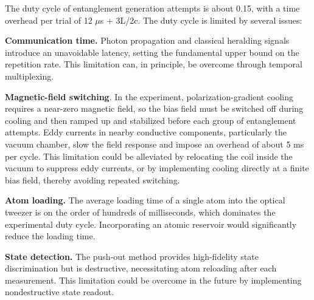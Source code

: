 \documentclass[aps,reprint,showpacs,superscriptaddress]{revtex4-2}
\begin{document}
The duty cycle of entanglement generation attempts is about 0.15, with a time overhead per trial of 12 $\mu$s + 3L/2c. The duty cycle is limited by several issues:

\textbf{Communication time.} Photon propagation and classical heralding signals introduce an unavoidable latency, setting the fundamental upper bound on the repetition rate. This limitation can, in principle, be overcome through temporal multiplexing.

\textbf{Magnetic-field switching}. In the experiment, polarization-gradient cooling requires a near-zero magnetic field, so the bias field must be switched off during cooling and then ramped up and stabilized before each group of entanglement attempts. Eddy currents in nearby conductive components, particularly the vacuum chamber, slow the field response and impose an overhead of about 5 ms per cycle. This limitation could be alleviated by relocating the coil inside the vacuum to suppress eddy currents, or by implementing cooling directly at a finite bias field, thereby avoiding repeated switching.

\textbf{Atom loading.} The average loading time of a single atom into the optical tweezer is on the order of hundreds of milliseconds, which dominates the experimental duty cycle. Incorporating an atomic reservoir would significantly reduce the loading time.

\textbf{State detection.} The push-out method provides high-fidelity state discrimination but is destructive, necessitating atom reloading after each measurement. This limitation could be overcome in the future by implementing nondestructive state readout.
\end{document}
